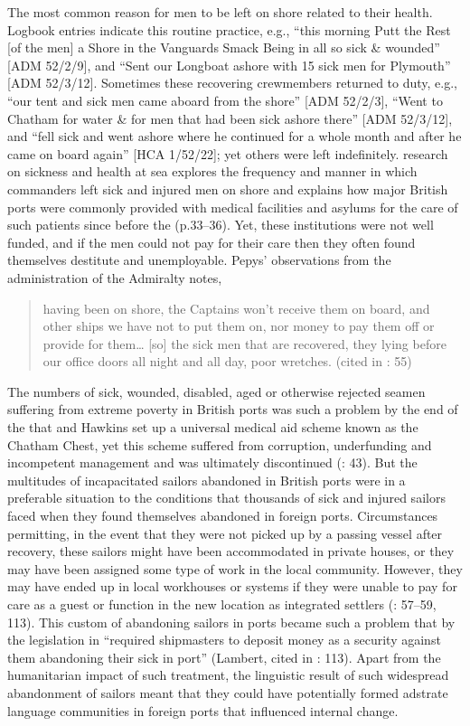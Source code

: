 The most common reason for men to be left on shore related to their health. Logbook entries indicate this routine practice, e.g., “this morning Putt the Rest [of the men] a Shore in the Vanguards Smack Being in all so sick \& wounded” [ADM 52/2/9], and “Sent our Longboat ashore with 15 sick men for Plymouth” [ADM 52/3/12]. Sometimes these recovering crewmembers returned to duty, e.g., “our tent and sick men came aboard from the shore” [ADM 52/2/3], “Went to Chatham for water \& for men that had been sick ashore there” [ADM 52/3/12], and “fell sick and went ashore where he continued for a whole month and after he came on board again” [HCA 1/52/22]; yet others were left indefinitely.  research on sickness and health at sea explores the frequency and manner in which commanders left sick and injured men on shore and explains how major British ports were commonly provided with medical facilities and asylums for the care of such patients since before the  (p.33–36). Yet, these institutions were not well funded, and if the men could not pay for their care then they often found themselves destitute and unemployable. Pepys’ observations from the administration of the Admiralty notes, 

\begin{quotation}
having been on shore, the Captains won’t receive them on board, and other ships we have not to put them on, nor money to pay them off or provide for them… [so] the sick men that are recovered, they lying before our office doors all night and all day, poor wretches. (cited in \citealt{Brown2011}: 55) \end{quotation}

The numbers of sick, wounded, disabled, aged or otherwise rejected seamen suffering from extreme poverty in British ports was such a problem by the end of the  that  and Hawkins set up a universal medical aid scheme known as the Chatham Chest, yet this scheme suffered from corruption, underfunding and incompetent management and was ultimately discontinued (\citealt{Brown2011}: 43). But the multitudes of incapacitated sailors abandoned in British ports were in a preferable situation to the conditions that thousands of sick and injured sailors faced when they found themselves abandoned in foreign ports. Circumstances permitting, in the event that they were not picked up by a passing vessel after recovery, these sailors might have been accommodated in private houses, or they may have been assigned some type of work in the local community. However, they may have ended up in local workhouses or  systems if they were unable to pay for care as a guest or function in the new location as integrated settlers (\citealt{Brown2011}: 57–59, 113). This custom of abandoning sailors in ports became such a problem that by the  legislation in  “required shipmasters to deposit money as a security against them abandoning their sick in port” (Lambert, cited in \citealt{Brown2011}: 113). Apart from the humanitarian impact of such treatment, the linguistic result of such widespread abandonment of sailors meant that they could have potentially formed adstrate language communities in foreign ports that influenced internal change.

